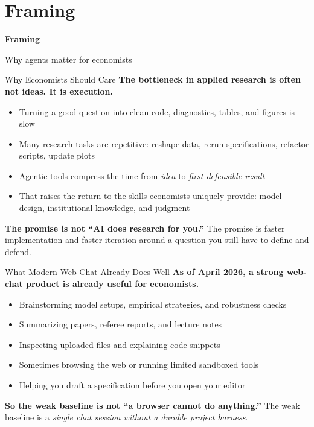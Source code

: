 \documentclass[10pt,english,aspectratio=169]{beamer}
\newcommand{\sectiondivider}[2]{%
\begin{frame}[plain,noframenumbering]
\begin{center}
\vfill
{\Large\textbf{#1}\par}
\vspace{0.35cm}
{\normalsize #2\par}
\vfill
\end{center}
\end{frame}
}
\begin{document}
\section{Framing}

\sectiondivider{Framing}{Why agents matter for economists}

\begin{frame}{Why Economists Should Care}
\textbf{The bottleneck in applied research is often not ideas. It is execution.}

\vspace{0.3cm}

\begin{itemize}
    \item Turning a good question into clean code, diagnostics, tables, and figures is slow
    \item Many research tasks are repetitive: reshape data, rerun specifications, refactor scripts, update plots
    \item Agentic tools compress the time from \textit{idea} to \textit{first defensible result}
    \item That raises the return to the skills economists uniquely provide: model design, institutional knowledge, and judgment
\end{itemize}

\vspace{0.3cm}

\textbf{The promise is not ``AI does research for you.''} The promise is faster implementation and faster iteration around a question you still have to define and defend.
\end{frame}

\begin{frame}{What Modern Web Chat Already Does Well}
\textbf{As of April 2026, a strong web-chat product is already useful for economists.}

\vspace{0.25cm}

\begin{itemize}
    \item Brainstorming model setups, empirical strategies, and robustness checks
    \item Summarizing papers, referee reports, and lecture notes
    \item Inspecting uploaded files and explaining code snippets
    \item Sometimes browsing the web or running limited sandboxed tools
    \item Helping you draft a specification before you open your editor
\end{itemize}

\vspace{0.3cm}

\textbf{So the weak baseline is not ``a browser cannot do anything.''} The weak baseline is a \textit{single chat session without a durable project harness}.
\end{frame}
\end{document}
